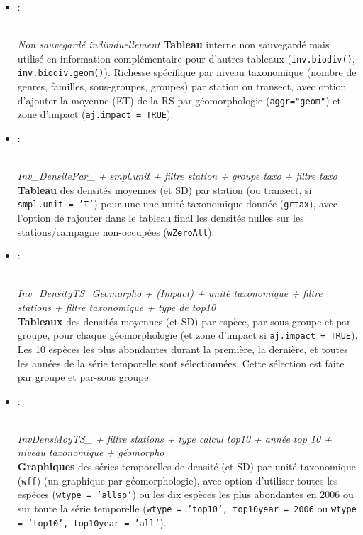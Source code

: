 \documentclass{article}
\begin{document}
\begin{itemize}
  \item[]  \hypertarget{i5}{:}\\
    \emph{Non sauvegardé individuellement}
    \textbf{Tableau} interne non sauvegardé mais utilisé en
    information complémentaire pour d'autres tableaux
    (\texttt{inv.biodiv()}, \texttt{inv.biodiv.geom()}). Richesse
    spécifique par niveau taxonomique (nombre de genres, familles, sous-groupes,
    groupes) par station ou transect, avec option d'ajouter la moyenne
    (ET) de la RS par géomorphologie (\texttt{aggr="geom"}) et zone
    d'impact (\texttt{aj.impact = TRUE}).

   \item[] \hypertarget{i6}{:}\\
\emph{Inv\_DensitePar\_ + smpl.unit + filtre station + groupe taxo + filtre taxo}\\
\textbf{Tableau} des densités moyennes (et SD) par station (ou
transect, si \texttt{smpl.unit = 'T'}) pour une
une unité taxonomique donnée (\texttt{grtax}), avec l'option de
rajouter dans le tableau final les densités nulles sur les
stations/campagne non-occupées (\texttt{wZeroAll}).

\item[] \hypertarget{i7}{:}\\
  \emph{Inv\_DensityTS\_Geomorpho + (Impact) + unité taxonomique +
    filtre stations + filtre taxonomique + type de top10}\\
  \textbf{Tableaux} des densités moyennes (et SD) par espèce, par
  sous-groupe et par groupe, pour chaque géomorphologie (et zone
  d'impact si \texttt{aj.impact = TRUE}). Les 10 espèces les plus
  abondantes durant la première, la
  dernière, et toutes les années de la série temporelle sont
  sélectionnées. Cette sélection est faite par groupe et par-sous
  groupe.

\item[] \hypertarget{i8}{:}\\
  \emph{InvDensMoyTS\_ + filtre stations + type calcul top10 + année
    top 10 + niveau taxonomique + géomorpho} \\
  \textbf{Graphiques} des séries temporelles de densité (et SD) par
  unité taxonomique (\texttt{wff}) (un graphique par géomorphologie),
  avec option d'utiliser toutes les espèces (\texttt{wtype = 'allsp'})
  ou les dix espèces les plus abondantes en 2006 ou sur toute la série
  temporelle (\texttt{wtype = 'top10', top10year = 2006} ou
  \texttt{wtype = 'top10', top10year = 'all'}).



\end{itemize}
\end{document}
